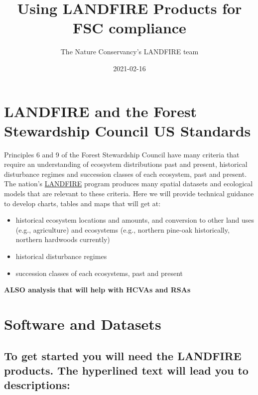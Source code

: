 \documentclass[
]{book}
\title{Using LANDFIRE Products for FSC compliance}
\author{The Nature Conservancy's LANDFIRE team}
\date{2021-02-16}
\providecommand{\tightlist}{%
  \setlength{\itemsep}{0pt}\setlength{\parskip}{0pt}}
\begin{document}
\maketitle

{
\setcounter{tocdepth}{1}
\tableofcontents
}
\hypertarget{landfire-and-the-forest-stewardship-council-us-standards}{%
\chapter{LANDFIRE and the Forest Stewardship Council US Standards}\label{landfire-and-the-forest-stewardship-council-us-standards}}

Principles 6 and 9 of the Forest Stewardship Council have many criteria that require an understanding of ecosystem distributions past and present, historical disturbance regimes and succession classes of each ecosystem, past and present. The nation's \href{www.landfire.gov}{LANDFIRE} program produces many spatial datasets and ecological models that are relevant to these criteria. Here we will provide technical guidance to develop charts, tables and maps that will get at:

\begin{itemize}
\tightlist
\item
  historical ecosystem locations and amounts, and conversion to other land uses (e.g., agriculture) and ecosystems (e.g., northern pine-oak historically, northern hardwoods currently)
\item
  historical disturbance regimes
\item
  succession classes of each ecosystems, past and present
\end{itemize}

\textbf{ALSO analysis that will help with HCVAs and RSAs}

\hypertarget{softAndData}{%
\chapter{Software and Datasets}\label{softAndData}}

\hypertarget{to-get-started-you-will-need-the-landfire-products.-the-hyperlined-text-will-lead-you-to-descriptions}{%
\section{To get started you will need the LANDFIRE products. The hyperlined text will lead you to descriptions:}\label{to-get-started-you-will-need-the-landfire-products.-the-hyperlined-text-will-lead-you-to-descriptions}}
\end{document}
